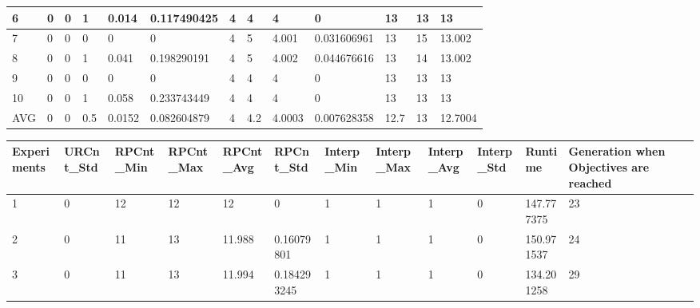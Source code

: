 \begin{table}[H]
\begin{adjustbox}{max width=480pt,keepaspectratio,angle=90}
\begin{tabular}{|l|l|l|l|l|l|l|l|l|l|l|l|l|}
					6           & 0         & 0         & 1         & 0.014     & 0.117490425 & 4            & 4            & 4            & 0            & 13         & 13         & 13         \\ \hline
					7           & 0         & 0         & 0         & 0         & 0           & 4            & 5            & 4.001        & 0.031606961  & 13         & 15         & 13.002     \\ \hline
					8           & 0         & 0         & 1         & 0.041     & 0.198290191 & 4            & 5            & 4.002        & 0.044676616  & 13         & 14         & 13.002     \\ \hline
					9           & 0         & 0         & 0         & 0         & 0           & 4            & 4            & 4            & 0            & 13         & 13         & 13         \\ \hline
					10          & 0         & 0         & 1         & 0.058     & 0.233743449 & 4            & 4            & 4            & 0            & 13         & 13         & 13         \\ \hline
					AVG         & 0         & 0         & 0.5       & 0.0152    & 0.082604879 & 4            & 4.2          & 4.0003       & 0.007628358  & 12.7       & 13         & 12.7004    \\ \hline
				\end{tabular}
			\end{adjustbox}
			\begin{adjustbox}{max width=460pt,keepaspectratio,angle=90}
				\begin{tabular}{|l|l|l|l|l|l|l|l|l|l|l|l|}
					\hline
					\rowcolor[HTML]{EFEFEF} 
					Experiments & URCnt\_Std  & RPCnt\_Min & RPCnt\_Max & RPCnt\_Avg & RPCnt\_Std  & Interp\_Min & Interp\_Max & Interp\_Avg & Interp\_Std & Runtime     & Generation when Objectives are reached \\ \hline
					1           & 0           & 12         & 12         & 12         & 0           & 1           & 1           & 1           & 0           & 147.777375  & 23                                     \\ \hline
					2           & 0           & 11         & 13         & 11.988     & 0.16079801  & 1           & 1           & 1           & 0           & 150.971537  & 24                                     \\ \hline
					3           & 0           & 11         & 13         & 11.994     & 0.184293245 & 1           & 1           & 1           & 0           & 134.201258  & 29                                     \\ \hline

\end{tabular}
\end{adjustbox}
\end{table}

